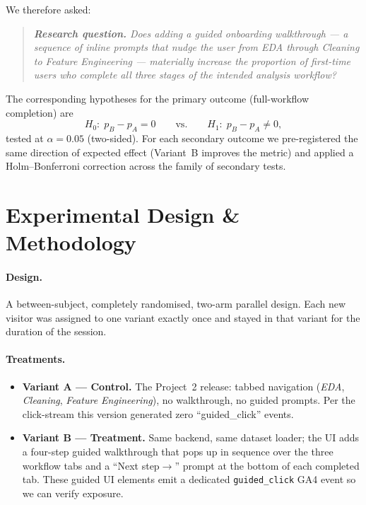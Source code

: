 \documentclass[11pt,a4paper]{article}
\begin{document}
We therefore asked:

\begin{quote}
\itshape
\textbf{Research question.} Does adding a guided onboarding
walkthrough — a sequence of inline prompts that nudge the user
from EDA through Cleaning to Feature Engineering — materially
increase the proportion of first-time users who complete all
three stages of the intended analysis workflow?
\end{quote}

\noindent The corresponding hypotheses for the primary outcome
(full-workflow completion) are
\[
  H_0:\; p_B - p_A = 0
  \qquad\text{vs.}\qquad
  H_1:\; p_B - p_A \neq 0,
\]
tested at $\alpha = 0.05$ (two-sided). For each secondary outcome
we pre-registered the same direction of expected effect (Variant~B
improves the metric) and applied a Holm--Bonferroni correction
across the family of secondary tests.

\section{Experimental Design \& Methodology}

\paragraph{Design.}
A between-subject, completely randomised, two-arm parallel
design. Each new visitor was assigned to one variant exactly once
and stayed in that variant for the duration of the session.

\paragraph{Treatments.}
\begin{itemize}[leftmargin=1.2em,itemsep=2pt]
\item \textbf{Variant A — Control.} The Project~2 release: tabbed
  navigation (\textit{EDA}, \textit{Cleaning},
  \textit{Feature Engineering}), no walkthrough, no guided
  prompts. Per the click-stream this version generated zero
  ``guided\_click'' events.
\item \textbf{Variant B — Treatment.} Same backend, same dataset
  loader; the UI adds a four-step guided walkthrough that pops up
  in sequence over the three workflow tabs and a ``Next
  step$\rightarrow$'' prompt at the bottom of each completed tab.
  These guided UI elements emit a dedicated
  \texttt{guided\_click} GA4 event so we can verify exposure.
\end{itemize}
\end{document}
